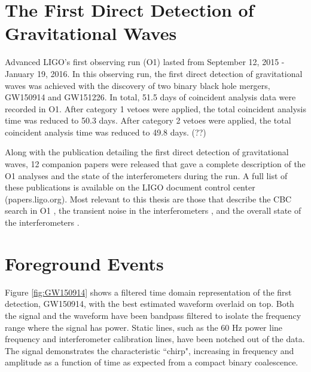 \section{The First Direct Detection of Gravitational Waves}

Advanced LIGO's first observing run (O1) lasted from September 12, 2015 - 
January 19, 2016. In this observing run, the first direct detection of 
gravitational waves was achieved with the discovery of two binary black 
hole mergers, GW150914 and GW151226. 
In total, 51.5 days of coincident analysis data were recorded in O1. 
After category 1 vetoes were applied, the total coincident analysis 
time was reduced to 50.3 days. After category 2 vetoes were applied, 
the total coincident analysis time was reduced to 49.8 days. (??) 

Along with the publication detailing the first direct detection of 
gravitational waves, 12 companion papers were released 
that gave a complete description of the O1 analyses and the state 
of the interferometers during the run. A full list of these 
publications is available on the LIGO document control center 
(papers.ligo.org). 
Most relevant to this thesis are those that describe the CBC search 
in O1 \cite{GW150914-CBC}, the transient noise in the interferometers 
\cite{GW150914-DETCHAR}, and the 
overall state of the interferometers \cite{GW150914-DETECTORS}. 

\section{Foreground Events}

Figure \ref{fig:GW150914} shows a 
filtered time domain representation of the first detection, 
GW150914, with the best estimated 
waveform overlaid on top. Both the signal and the waveform have been 
bandpass filtered to isolate the frequency range where the signal has 
power. Static lines, such as the 60 Hz power line frequency and 
interferometer calibration lines, have been notched out of the data. 
The signal demonstrates the characteristic ``chirp", 
increasing in frequency and amplitude as a function of time as  
expected from a compact binary coalescence. 

